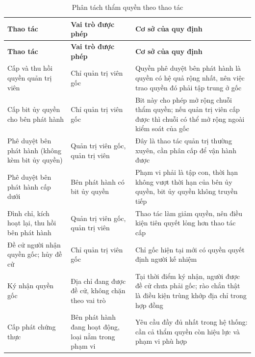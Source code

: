 \begin{longtable}{|p{4.3cm}|p{3.2cm}|p{6.5cm}|}
\caption{Phân tách thẩm quyền theo thao tác}
\label{tab:role-permission} \\

\hline
\textbf{Thao tác} & \textbf{Vai trò được phép} & \textbf{Cơ sở của quy định} \\
\hline
\endfirsthead

\hline
\textbf{Thao tác} & \textbf{Vai trò được phép} & \textbf{Cơ sở của quy định} \\
\hline
\endhead

\hline
\endfoot

\hline
\endlastfoot

Cấp và thu hồi quyền quản trị viên
& Chỉ quản trị viên gốc
& Quyền phê duyệt bên phát hành là quyền có hệ quả rộng nhất, nên việc trao quyền đó phải tập trung ở gốc
\\ \hline

Cấp bit ủy quyền cho bên phát hành
& Chỉ quản trị viên gốc
& Bit này cho phép mở rộng chuỗi thẩm quyền; nếu quản trị viên cấp được thì chuỗi có thể mở rộng ngoài kiểm soát của gốc
\\ \hline

Phê duyệt bên phát hành (không kèm bit ủy quyền)
& Quản trị viên gốc, quản trị viên
& Đây là thao tác quản trị thường xuyên, cần phân cấp để vận hành được
\\ \hline

Phê duyệt bên phát hành cấp dưới
& Bên phát hành có bit ủy quyền
& Phạm vi phải là tập con, thời hạn không vượt thời hạn của bên ủy quyền, bit ủy quyền không truyền tiếp
\\ \hline

Đình chỉ, kích hoạt lại, thu hồi bên phát hành
& Quản trị viên gốc, quản trị viên
& Thao tác làm giảm quyền, nên điều kiện tiên quyết lỏng hơn thao tác cấp
\\ \hline

Đề cử người nhận quyền gốc; hủy đề cử
& Chỉ quản trị viên gốc
& Chỉ gốc hiện tại mới có quyền quyết định người kế nhiệm
\\ \hline

Ký nhận quyền gốc
& Địa chỉ đang được đề cử, không chặn theo vai trò
& Tại thời điểm ký nhận, người được đề cử chưa phải gốc; rào chắn thật là điều kiện trùng khớp địa chỉ trong hợp đồng
\\ \hline

Cấp phát chứng thực
& Bên phát hành đang hoạt động, loại nằm trong phạm vi
& Yêu cầu đầy đủ nhất trong hệ thống: cần cả thẩm quyền còn hiệu lực và phạm vi phù hợp
\\ \hline


\end{longtable}
